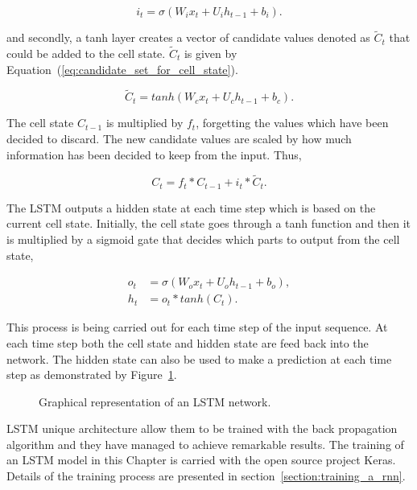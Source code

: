 \begin{equation}\label{eq:input_gate}
    i_{t} = \sigma(W_{i}x_{t} + U_{i}h_{t-1} + b_{i}).
\end{equation}

and secondly, a tanh layer creates a vector of candidate values denoted as
\(\tilde{C}_{t}\) that could be added to the cell state. \(\tilde{C}_{t}\) 
is given by Equation~(\ref{eq:candidate_set_for_cell_state}).

\begin{equation}\label{eq:candidate_set_for_cell_state}
    \tilde{C}_{t} = tanh(W_{c}x_{t} + U_{c}h_{t-1} + b_{c}).
\end{equation}

The cell state \(C_{t-1}\) is multiplied by \(f_{t}\), forgetting the values
which have been decided to discard. The new candidate values are scaled by how
much information has been decided to keep from the input. Thus,

\begin{equation}\label{eq:cell_gate}
    C_{t} = f_{t} * C_{t-1} + i_{t} * \tilde{C}_{t}.
\end{equation}

The LSTM outputs a hidden state at each time step which is based on the current
cell state. Initially, the cell state goes through a tanh function and then it
is multiplied by a sigmoid gate that decides which parts to output from the cell
state,

\begin{align}\label{eq:outpu_gate}
    o_{t} & = \sigma(W_{o}x_{t} + U_{o}h_{t-1} + b_{o}), \\
    h_{t} & = o_{t} * tanh(C_{t}).
\end{align}

This process is being carried out for each time step of the input sequence. At
each time step both the cell state and hidden state are feed back into the
network. The hidden state can also be used to make a prediction at each time
step as demonstrated by Figure~\ref{fig:lstm}.

\begin{figure}[!htbp]
    \centering
    
    \caption{Graphical representation of an LSTM network.}\label{fig:lstm}
\end{figure}

LSTM unique architecture allow them to be trained with the back propagation
algorithm and they have managed to achieve remarkable results. The training of
an LSTM model in this Chapter is carried with the open source project Keras.
Details of the training process are presented in
section~\ref{section:training_a_rnn}.

